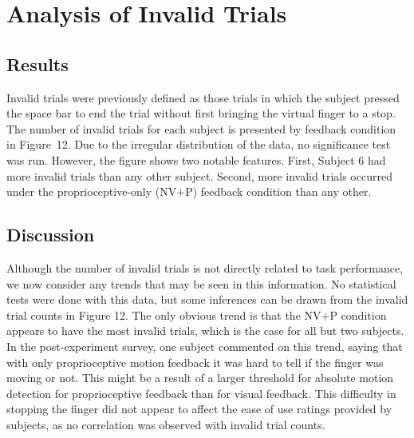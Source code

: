 \documentclass[prodmode,acmtap]{acmlarge}
\begin{document}
\elecappendix


\section{Analysis of Invalid Trials}
\label{invalid}

\subsection{Results}


Invalid trials were previously defined as those trials in which the
subject pressed the space bar to end the trial without first bringing
the virtual finger to a stop. The number of invalid trials for each
subject is presented by feedback condition in Figure~12. Due to the
irregular distribution of the data, no significance test was run.
However, the figure shows two notable features. First, Subject 6 had
more invalid trials than any other subject. Second, more invalid
trials occurred under the proprioceptive-only (NV$+$P) feedback
condition than any other.



\subsection{Discussion}

Although the number of invalid trials is not directly related to task
performance, we now consider any trends that may be seen in this
information. No statistical tests were done with this data, but some
inferences can be drawn from the invalid trial counts in Figure 12.
The only obvious trend is that the NV$+$P condition appears to have
the most invalid trials, which is the case for all but two subjects.
In the post-experiment survey, one subject commented on this trend,
saying that with only proprioceptive motion feedback it was hard to
tell if the finger was moving or not. This might be a result of a
larger threshold for absolute motion detection for proprioceptive
feedback than for visual feedback. This difficulty in stopping the
finger did not appear to affect the ease of use ratings provided by
subjects, as no correlation was observed with invalid trial counts.
\end{document}
